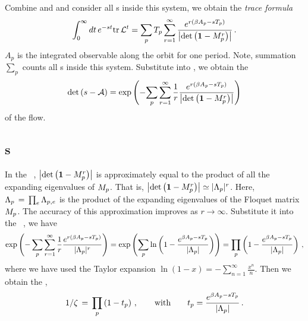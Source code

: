 Combine  and  and consider all \po s inside
this system, we obtain the
\emph{trace formula}
\begin{equation}
  \label{eq:tr}
  \int_0^\infty dt \, e^{-st} \mathrm{tr}\,\mathcal{L}^t =
  \sum_p {T_{p}} \sum_{r=1}^\infty
  { e^{r (\beta A_p -\ensuremath{s}{\ensuremath{T_{p}}})}
    \over  \left|\mathrm{det}\,\!\left(\ensuremath{{\bf 1}}-\ensuremath{M}_p^{r}\right)\right| }
  \,.
\end{equation}
$A_p$ is the integrated observable along the orbit for one period.
Note, summation $\sum_p$ counts all \po s inside this system.
Substitute  into , we obtain the
\emph{\Fd}
\begin{equation}
  \mathrm{det}\,(s - \mathcal{A})  = \exp \left(
    - {
      \sum_{p} \sum_{r=1}^\infty \frac{1}{r}
      \frac{   e^{r (\beta A_p -s{T_{p}}) }}
      {\left|\mathrm{det}\,\!\left({\bf 1}-M_p^{r}\right)\right|}
    }\right)
  \label{eq:sd}
\end{equation}
of the flow.

\subsection{\Dzeta s}
\label{sect:zeta}

In the \Fd\ , $\left|\mathrm{det}\,\!\left({\bf 1}-M_p^{r}\right)\right|$
is approximately equal to the product of all the expanding eigenvalues
of $M_p$. That is, $\left|\mathrm{det}\,\!\left({\bf 1}-M_p^{r}\right)\right| \simeq |\Lambda_p|^r$. Here,
$ \Lambda_p\,=\,\prod_e \Lambda_{p,e}$ is
the product of the expanding eigenvalues of the
Floquet matrix $M_p$.
The accuracy of this approximation improves as $r\to\infty$.
Substitute it into the \Fd\ ,
we have
\[
  \exp \left(
    -\sum_{p} \sum_{r=1}^\infty \frac{1}{r}
    \frac{   e^{r (\beta A_p -s{T_{p}}) }}
    {|\Lambda_p|^r}
  \right)
  = \exp \left(
    \sum_{p} \ln \left( 1 -
      \frac{   e^{\beta A_p -s{T_{p}} }}{|\Lambda_p|}
    \right)
  \right)
  = \prod_{p} \left(
    1 -
    \frac{   e^{\beta A_p -s{T_{p}} }}{|\Lambda_p|}
  \right)
  \,,
\]
where we have used the Taylor expansion
$\ln(1 - x) = -\sum_{n=1}^\infty \frac{x^n}{n}$.
Then we obtain the {\em \dzeta},
\begin{equation}
  1/\zeta
  \,=\,\prod_{p}
  \left( 1 - t_p \right)
  \,,\qquad \text{with} \qquad
  t_p = \frac{   e^{\beta A_p -s{T_{p}} }}{|\Lambda_p|}
  \,.
  \label{eq:zeta}
\end{equation}

